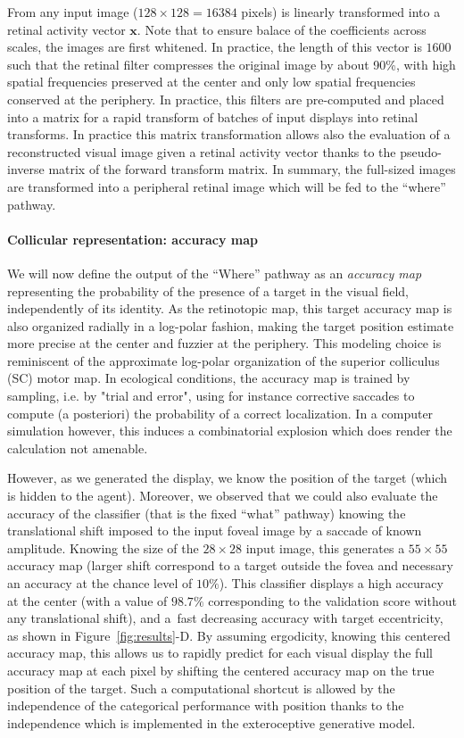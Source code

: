 From any input image ($128\times 128=16384$ pixels) is linearly transformed into a retinal activity vector $\boldsymbol{x}$. Note that to ensure balace of the coefficients across scales, the images are first whitened. In practice, the length of this vector is $1600$ such that the retinal filter compresses the original image by about 90\%, with high spatial frequencies preserved at the center and only low spatial frequencies conserved at the periphery. In practice, this filters are pre-computed and placed into a matrix for a rapid transform of batches of input displays into retinal transforms. In practice this matrix transformation allows also the evaluation of a reconstructed visual image given a retinal activity vector thanks to the pseudo-inverse matrix of the forward transform matrix. In summary, the full-sized images are transformed into a peripheral retinal image which will be fed to the ``where'' pathway.

\paragraph{Collicular representation: accuracy map}
We will now define the output of the ``Where'' pathway as an \emph{accuracy map} representing the probability of the presence of a target in the visual field, independently of its identity. As the retinotopic map, this target accuracy map is also organized radially in a log-polar fashion, making the target position estimate more precise at the center and fuzzier at the periphery. This modeling choice is reminiscent of the approximate log-polar organization of the superior colliculus (SC) motor map. In ecological conditions, the accuracy map is trained by sampling, i.e. by "trial and error", using for instance corrective saccades to compute (a posteriori) the probability of a correct localization. In a computer simulation however, this induces a combinatorial explosion which does render the calculation not amenable.

However, as we generated the display, we know the position of the target (which is hidden to the agent). Moreover, we observed that we could also evaluate the accuracy of the classifier (that is the fixed ``what'' pathway) knowing the translational shift imposed to the input foveal image by a saccade of known amplitude. Knowing the size of the $28\times 28$ input image, this generates a $55\times 55$ accuracy map (larger shift correspond to a target outside the fovea and necessary an accuracy at the chance level of $10\%$). This classifier displays a high accuracy at the center (with a value of $98.7\%$ corresponding to the validation score without any translational shift), and a fast decreasing accuracy with target eccentricity, as shown in Figure~\ref{fig:results}-D. By assuming ergodicity, knowing this centered accuracy map, this allows us to rapidly predict for each visual display the full accuracy map at each pixel by shifting the centered accuracy map on the true position of the target. Such a computational shortcut is allowed by the independence of the categorical performance with position thanks to the independence which is implemented in the exteroceptive generative model.

